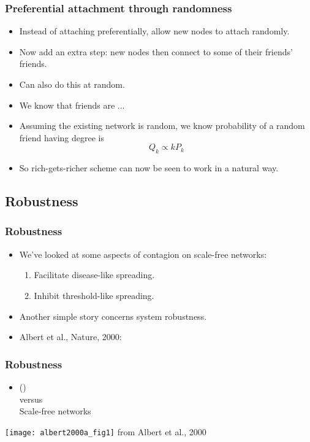 \begin{frame}[label=]
 \frametitle{Preferential attachment through randomness}  

 \begin{itemize}
 \item<1-> Instead of attaching preferentially, allow
   new nodes to attach randomly.
 \item<2-> Now add an \alert{extra step}: new nodes
   then connect to some of their friends' friends.
 \item<3-> Can also do this \alert{at random}.
 \item<4-> We know that friends are ...
 \item<5-> Assuming the existing network is random,
   we know probability of a \alert{random friend} having
   degree  is 
   $$Q_k \propto kP_k$$
 \item<6-> So \alert{rich-gets-richer} scheme can
   now be seen to work in a natural way.
 \end{itemize}

\end{frame}

\subsection{Robustness}

\begin{frame}[label=]
 \frametitle{Robustness}  

 \begin{itemize}
 \item<1->
   We've looked at some aspects of 
   contagion on scale-free networks:
   \begin{enumerate}
   \item<2-> 
     Facilitate disease-like spreading.
   \item<3-> 
     Inhibit threshold-like spreading.
   \end{enumerate}
 \item<4->
   Another simple story concerns \alert{system robustness}.
 \item<5->
   Albert et al., Nature, 2000:\\
   \cite{albert2000a}
 \end{itemize}

\end{frame}


\begin{frame}[label=]
 \frametitle{Robustness}  

 \begin{itemize}
 \item {} (\erdosrenyi)\\
   versus\\
   \alert{Scale-free networks}
 \end{itemize}

 \texttt{[image: albert2000a\_fig1]}
 {\tiny from Albert et al., 2000}

\end{frame}


